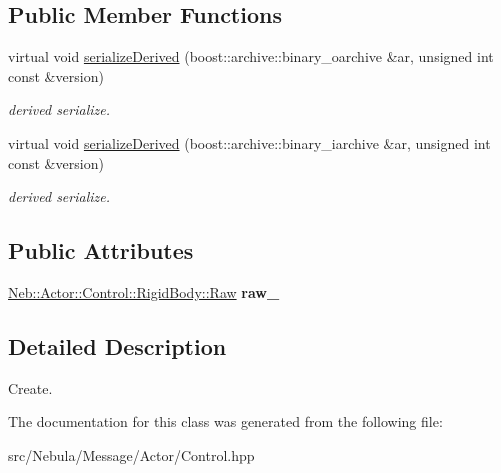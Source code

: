 \subsection*{\-Public \-Member \-Functions}
\begin{DoxyCompactItemize}
\item 
\hypertarget{classNeb_1_1Message_1_1Actor_1_1Control_1_1RigidBody_1_1Create_aa390bc059f2eea71aed8d255faf23509}{virtual void \hyperlink{classNeb_1_1Message_1_1Actor_1_1Control_1_1RigidBody_1_1Create_aa390bc059f2eea71aed8d255faf23509}{serialize\-Derived} (boost\-::archive\-::binary\-\_\-oarchive \&ar, unsigned int const \&version)}\label{classNeb_1_1Message_1_1Actor_1_1Control_1_1RigidBody_1_1Create_aa390bc059f2eea71aed8d255faf23509}

\begin{DoxyCompactList}\small\item\em derived serialize. \end{DoxyCompactList}\item 
\hypertarget{classNeb_1_1Message_1_1Actor_1_1Control_1_1RigidBody_1_1Create_a6784429360fa42e6146a696d7e164731}{virtual void \hyperlink{classNeb_1_1Message_1_1Actor_1_1Control_1_1RigidBody_1_1Create_a6784429360fa42e6146a696d7e164731}{serialize\-Derived} (boost\-::archive\-::binary\-\_\-iarchive \&ar, unsigned int const \&version)}\label{classNeb_1_1Message_1_1Actor_1_1Control_1_1RigidBody_1_1Create_a6784429360fa42e6146a696d7e164731}

\begin{DoxyCompactList}\small\item\em derived serialize. \end{DoxyCompactList}\end{DoxyCompactItemize}
\subsection*{\-Public \-Attributes}
\begin{DoxyCompactItemize}
\item 
\hypertarget{classNeb_1_1Message_1_1Actor_1_1Control_1_1RigidBody_1_1Create_a14e77739ef573690efb085293bd3a4f8}{\hyperlink{classNeb_1_1Actor_1_1Control_1_1RigidBody_1_1Raw}{\-Neb\-::\-Actor\-::\-Control\-::\-Rigid\-Body\-::\-Raw} {\bfseries raw\-\_\-}}\label{classNeb_1_1Message_1_1Actor_1_1Control_1_1RigidBody_1_1Create_a14e77739ef573690efb085293bd3a4f8}

\end{DoxyCompactItemize}


\subsection{\-Detailed \-Description}
\-Create. 

\-The documentation for this class was generated from the following file\-:\begin{DoxyCompactItemize}
\item 
src/\-Nebula/\-Message/\-Actor/\-Control.\-hpp\end{DoxyCompactItemize}
